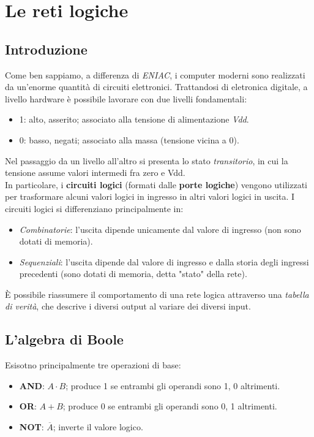 \documentclass[class=book, crop=false]{standalone}
\begin{document}
\chapter{Le reti logiche}
\section{Introduzione}
Come ben sappiamo, a differenza di \emph{ENIAC}, i computer moderni sono realizzati da un'enorme quantità di circuiti elettronici. Trattandosi di eletronica digitale, a livello hardware è possibile lavorare con due livelli fondamentali:
\begin{itemize}[noitemsep, nolistsep]
	\item 1: alto, asserito; associato alla tensione di alimentazione \emph{Vdd}.
	\item 0: basso, negati; associato alla massa (tensione vicina a 0).
\end{itemize}
Nel passaggio da un livello all'altro si presenta lo stato \emph{transitorio}, in cui la tensione assume valori intermedi fra zero e Vdd.\\
In particolare, i \textbf{circuiti logici} (formati dalle \textbf{porte logiche}) vengono utilizzati per trasformare alcuni valori logici in ingresso in altri valori logici in uscita. I circuiti logici si differenziano principalmente in:
\begin{itemize}[nolistsep, noitemsep]
	\item \emph{Combinatorie}: l'uscita dipende unicamente dal valore di ingresso (non sono dotati di memoria).
	\item \emph{Sequenziali}: l'uscita dipende dal valore di ingresso e dalla storia degli ingressi precedenti (sono dotati di memoria, detta "stato" della rete).
\end{itemize}
\`{E} possibile riassumere il comportamento di una rete logica attraverso una \emph{tabella di verità}, che descrive i diversi output al variare dei diversi input.

\section{L'algebra di Boole}
Esisotno principalmente tre operazioni di base:
\begin{itemize}[noitemsep, nolistsep]
	\item \textbf{AND}: \(A\cdot B\); produce 1 se entrambi gli operandi sono 1, 0 altrimenti.
	\item \textbf{OR}: \(A+B\); produce 0 se entrambi gli operandi sono 0, 1 altrimenti.
	\item \textbf{NOT}: \(\overline{A}\); inverte il valore logico.
\end{itemize}
\end{document}

